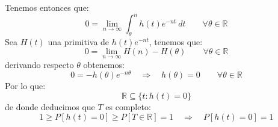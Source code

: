 \begin{ejercicio}
\begin{equation*}
    \end{equation*}
    Tenemos entonces que:
    \begin{equation*}
        0 = \lim_{n\to\infty}\int_{\theta}^{n} h(t)e^{-nt}~dt  \qquad \forall \theta\in \mathbb{R}
    \end{equation*}
    Sea $H(t)$ una primitiva de $h(t)e^{-nt}$, tenemos que:
    \begin{equation*}
        0 = \lim_{n\to\infty}H(n)-H(\theta)\qquad \forall \theta\in \mathbb{R}
    \end{equation*}
    derivando respecto $\theta$ obtenemos:
    \begin{equation*}
        0 = -h(\theta)e^{-n\theta} \quad \Longrightarrow \quad  h(\theta) = 0 \qquad \forall \theta\in \mathbb{R}
    \end{equation*}
    Por lo que:
    \begin{equation*}
        \mathbb{R}\subseteq \{t:h(t) = 0\}
    \end{equation*}
    de donde deducimos que $T$ es completo:
    \begin{equation*}
        1 \geq P[h(t) = 0] \geq P[T\in \mathbb{R}] = 1 \quad \Longrightarrow \quad P[h(t)=0] = 1
    \end{equation*}


\end{ejercicio}
